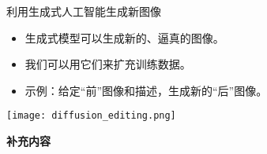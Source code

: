  
\begin{refsection}
  \begin{frame}{利用生成式人工智能生成新图像}
    \begin{itemize}
      \item 生成式模型可以生成新的、逼真的图像。
      \item 我们可以用它们来扩充训练数据。
      \item 示例：给定“前”图像和描述，生成新的“后”图像。
    \end{itemize}
    \centering
    \texttt{[image: diffusion\_editing.png]}
  \end{frame}
  \end{refsection}

  
\begin{refsection}
  \begin{frame}
    \centering
    \vspace{2.5cm}
    {\LARGE \textbf{补充内容}}
  \end{frame}
\end{refsection}

